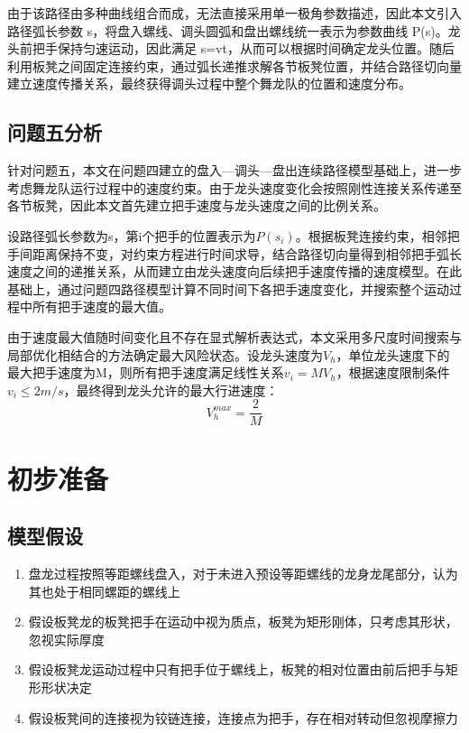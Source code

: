 \documentclass[UTF-8,a4paper,zihao=-4]{ctexart}
\begin{document}
由于该路径由多种曲线组合而成，无法直接采用单一极角参数描述，因此本文引入路径弧长参数 s，将盘入螺线、调头圆弧和盘出螺线统一表示为参数曲线 P(s)。龙头前把手保持匀速运动，因此满足 s=vt，从而可以根据时间确定龙头位置。随后利用板凳之间固定连接约束，通过弧长递推求解各节板凳位置，并结合路径切向量建立速度传播关系，最终获得调头过程中整个舞龙队的位置和速度分布。

\subsection{问题五分析}针对问题五，本文在问题四建立的盘入—调头—盘出连续路径模型基础上，进一步考虑舞龙队运行过程中的速度约束。由于龙头速度变化会按照刚性连接关系传递至各节板凳，因此本文首先建立把手速度与龙头速度之间的比例关系。

设路径弧长参数为s，第i个把手的位置表示为$P(s_i)$。根据板凳连接约束，相邻把手间距离保持不变，对约束方程进行时间求导，结合路径切向量得到相邻把手弧长速度之间的递推关系，从而建立由龙头速度向后续把手速度传播的速度模型。在此基础上，通过问题四路径模型计算不同时间下各把手速度变化，并搜索整个运动过程中所有把手速度的最大值。

由于速度最大值随时间变化且不存在显式解析表达式，本文采用多尺度时间搜索与局部优化相结合的方法确定最大风险状态。设龙头速度为$V_h$，单位龙头速度下的最大把手速度为M，则所有把手速度满足线性关系$v_i=MV_h$，根据速度限制条件$v_i\le2m/s$，最终得到龙头允许的最大行进速度：
\begin{equation}
    V_h^{max}=\frac{2}{M}
\end{equation}


\section{初步准备}
\subsection{模型假设}
\begin{enumerate}
    \item 盘龙过程按照等距螺线盘入，对于未进入预设等距螺线的龙身龙尾部分，认为其也处于相同螺距的螺线上
    \item 假设板凳龙的板凳把手在运动中视为质点，板凳为矩形刚体，只考虑其形状，忽视实际厚度
    \item 假设板凳龙运动过程中只有把手位于螺线上，板凳的相对位置由前后把手与矩形形状决定
    \item 假设板凳间的连接视为铰链连接，连接点为把手，存在相对转动但忽视摩擦力
    
\end{enumerate}
\end{document}
